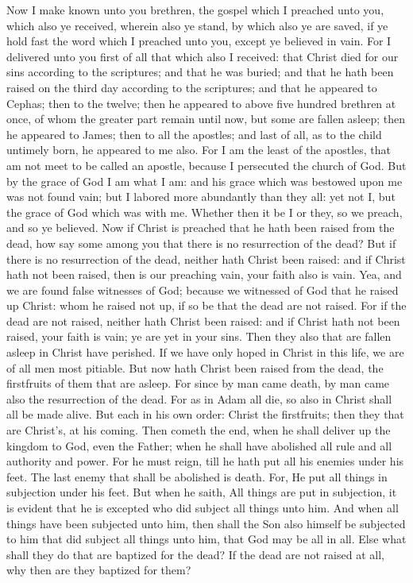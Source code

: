 Now I make known unto you brethren, the gospel which I preached unto you, which also ye received, wherein also ye stand, by which also ye are saved, if ye hold fast the word which I preached unto you, except ye believed in vain. For I delivered unto you first of all that which also I received: that Christ died for our sins according to the scriptures; and that he was buried; and that he hath been raised on the third day according to the scriptures; and that he appeared to Cephas; then to the twelve; then he appeared to above five hundred brethren at once, of whom the greater part remain until now, but some are fallen asleep; then he appeared to James; then to all the apostles; and last of all, as to the child untimely born, he appeared to me also. For I am the least of the apostles, that am not meet to be called an apostle, because I persecuted the church of God. But by the grace of God I am what I am: and his grace which was bestowed upon me was not found vain; but I labored more abundantly than they all: yet not I, but the grace of God which was with me. Whether then it be I or they, so we preach, and so ye believed.  Now if Christ is preached that he hath been raised from the dead, how say some among you that there is no resurrection of the dead? But if there is no resurrection of the dead, neither hath Christ been raised: and if Christ hath not been raised, then is our preaching vain, your faith also is vain. Yea, and we are found false witnesses of God; because we witnessed of God that he raised up Christ: whom he raised not up, if so be that the dead are not raised. For if the dead are not raised, neither hath Christ been raised: and if Christ hath not been raised, your faith is vain; ye are yet in your sins. Then they also that are fallen asleep in Christ have perished. If we have only hoped in Christ in this life, we are of all men most pitiable.  But now hath Christ been raised from the dead, the firstfruits of them that are asleep. For since by man came death, by man came also the resurrection of the dead. For as in Adam all die, so also in Christ shall all be made alive. But each in his own order: Christ the firstfruits; then they that are Christ’s, at his coming. Then cometh the end, when he shall deliver up the kingdom to God, even the Father; when he shall have abolished all rule and all authority and power. For he must reign, till he hath put all his enemies under his feet. The last enemy that shall be abolished is death. For, He put all things in subjection under his feet. But when he saith, All things are put in subjection, it is evident that he is excepted who did subject all things unto him. And when all things have been subjected unto him, then shall the Son also himself be subjected to him that did subject all things unto him, that God may be all in all.  Else what shall they do that are baptized for the dead? If the dead are not raised at all, why then are they baptized for them? 